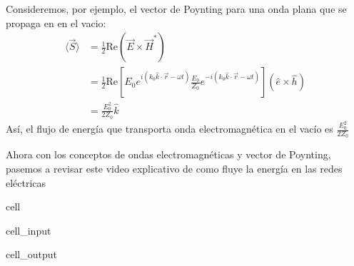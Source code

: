 \documentclass[letterpaper,10pt,english]{jupyterBook}
\begin{document}
\sphinxAtStartPar
Consideremos, por ejemplo, el vector de Poynting para una onda plana que se propaga en en el vacio:
\begin{align*}
\langle\vec{S}\rangle &= \frac{1}{2}\mathrm{Re}\left(\vec{E}\times\vec{H}^*\right) \\
&=\frac{1}{2}\mathrm{Re}\left[E_0 e^{i\left(k_0\hat{k}\cdot\vec{r} - \omega t\right)}\frac{E_0}{Z_0}e^{-i\left(k_0\hat{k}\cdot\vec{r} - \omega t\right)}\right] \left(\hat{e}\times\hat{h}\right)\\
&=\frac{E_0^2}{2Z_0} \hat{k}
\end{align*}
\sphinxAtStartPar
Así, el flujo de energía que transporta onda electromagnética en el vacío es \(\frac{E_0^2}{2Z_0}\)

\sphinxAtStartPar
Ahora con los conceptos de ondas electromagnéticas y vector de Poynting, pasemos a revisar este video explicativo de como fluye la energía en las redes eléctricas

\begin{sphinxuseclass}{cell}\begin{sphinxVerbatimInput}

\begin{sphinxuseclass}{cell_input}
\begin{sphinxVerbatim}[commandchars=\\\{\}]
   
     
\end{sphinxVerbatim}

\end{sphinxuseclass}\end{sphinxVerbatimInput}
\begin{sphinxVerbatimOutput}

\begin{sphinxuseclass}{cell_output}
\noindent{}

\end{sphinxuseclass}\end{sphinxVerbatimOutput}

\end{sphinxuseclass}
\end{document}
